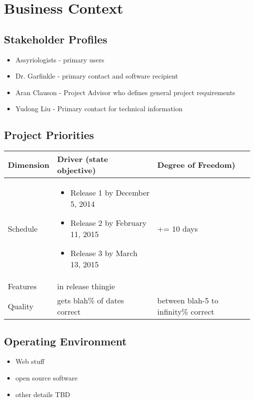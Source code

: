 \documentclass[11pt]{article}
\begin{document}
\section{Business Context}
\subsection{Stakeholder Profiles}
\begin{itemize}
    \item Assyriologists - primary users
    \item Dr. Garfinkle - primary contact and software recipient
    \item Aran Clauson - Project Advisor who defines general project requirements
    \item Yudong Liu - Primary contact for technical information
\end{itemize}

\subsection{Project Priorities}
\begin{tabularx}{\textwidth}{|l|X|l|}
    \hline
    \textbf{Dimension} & \textbf{Driver (state objective)} & \textbf{Degree of Freedom)} \\
    \hline
    Schedule &
        \begin{itemize}
            \item Release 1 by December 5, 2014 
            \item Release 2 by February 11, 2015
            \item Release 3 by March 13, 2015
        \end{itemize}
    & += 10 days \\
    \hline
    Features & in release thingie & \\
    \hline
    Quality & gets blah\% of dates correct & between blah-5 to infinity\% correct \\
    \hline
\end{tabularx}

\subsection{Operating Environment}
\begin{itemize}
    \item Web stuff
    \item open source software
    \item other details TBD
\end{itemize}
\end{document}
